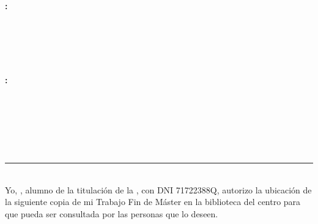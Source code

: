 \chapter*{}



\cleardoublepage
\thispagestyle{empty}

\begin{center}
{\large\bfseries \myTitle: \mySubtitle}\\
\end{center}

\begin{center}
\myName \\
\end{center}

\vspace{0.7cm}
\\

\vspace{0.7cm}
\\


\thispagestyle{empty}

\cleardoublepage

\begin{center}
	{\large\bfseries \myTitle: \myEnglishSubtitle}\\
\end{center}

\begin{center}
	\myName \\
\end{center}

\vspace{0.7cm}
\\

\vspace{0.7cm}
\\


\chapter*{}
\thispagestyle{empty}

\noindent\rule[-1ex]{\textwidth}{2pt}\\[4.5ex]

Yo, \textbf{\myName}, alumno de la titulación \myDegree de la \textbf{\myFaculty}, con DNI 71722388Q, autorizo la ubicación de la siguiente copia de mi Trabajo Fin de Máster en la biblioteca del centro para que pueda ser consultada por las personas que lo deseen.


